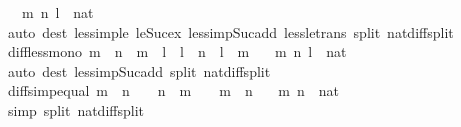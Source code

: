 \begin{isabellebody}
\ \ \ m\ n\ l\ {\isacharcolon}{\kern0pt}{\isacharcolon}{\kern0pt}\ nat\isanewline
%
\isadelimproof
\ \ %
\endisadelimproof
%
\isatagproof
{}\isamarkupfalse%
\ {\isacharparenleft}{\kern0pt}auto\ dest{\isacharcolon}{\kern0pt}\ less{\isacharunderscore}{\kern0pt}imp{\isacharunderscore}{\kern0pt}le\ le{\isacharunderscore}{\kern0pt}Suc{\isacharunderscore}{\kern0pt}ex\ less{\isacharunderscore}{\kern0pt}imp{\isacharunderscore}{\kern0pt}Suc{\isacharunderscore}{\kern0pt}add\ less{\isacharunderscore}{\kern0pt}le{\isacharunderscore}{\kern0pt}trans\ split{\isacharcolon}{\kern0pt}\ nat{\isacharunderscore}{\kern0pt}diff{\isacharunderscore}{\kern0pt}split{\isacharparenright}{\kern0pt}%
\endisatagproof
{\isafoldproof}%
%
\isadelimproof
\isanewline
%
\endisadelimproof
\isanewline
{}\isamarkupfalse%
\ diff{\isacharunderscore}{\kern0pt}less{\isacharunderscore}{\kern0pt}mono{}{\isacharcolon}{\kern0pt}\ {\isachardoublequoteopen}m\ {\isacharless}{\kern0pt}\ n\ {\isasymLongrightarrow}\ m\ {\isacharless}{\kern0pt}\ l\ {\isasymLongrightarrow}\ l\ {\isacharminus}{\kern0pt}\ n\ {\isacharless}{\kern0pt}\ l\ {\isacharminus}{\kern0pt}\ m{\isachardoublequoteclose}\isanewline
\ \ \ m\ n\ l\ {\isacharcolon}{\kern0pt}{\isacharcolon}{\kern0pt}\ nat\isanewline
%
\isadelimproof
\ \ %
\endisadelimproof
%
\isatagproof
{}\isamarkupfalse%
\ {\isacharparenleft}{\kern0pt}auto\ dest{\isacharcolon}{\kern0pt}\ less{\isacharunderscore}{\kern0pt}imp{\isacharunderscore}{\kern0pt}Suc{\isacharunderscore}{\kern0pt}add\ split{\isacharcolon}{\kern0pt}\ nat{\isacharunderscore}{\kern0pt}diff{\isacharunderscore}{\kern0pt}split{\isacharparenright}{\kern0pt}%
\endisatagproof
{\isafoldproof}%
%
\isadelimproof
\isanewline
%
\endisadelimproof
\isanewline
{}\isamarkupfalse%
\ diffs{}{\isacharunderscore}{\kern0pt}imp{\isacharunderscore}{\kern0pt}equal{\isacharcolon}{\kern0pt}\ {\isachardoublequoteopen}m\ {\isacharminus}{\kern0pt}\ n\ {\isacharequal}{\kern0pt}\ {}\ {\isasymLongrightarrow}\ n\ {\isacharminus}{\kern0pt}\ m\ {\isacharequal}{\kern0pt}\ {}\ {\isasymLongrightarrow}\ m\ {\isacharequal}{\kern0pt}\ n{\isachardoublequoteclose}\isanewline
\ \ \ m\ n\ {\isacharcolon}{\kern0pt}{\isacharcolon}{\kern0pt}\ nat\isanewline
%
\isadelimproof
\ \ %
\endisadelimproof
%
\isatagproof
{}\isamarkupfalse%
\ {\isacharparenleft}{\kern0pt}simp\ split{\isacharcolon}{\kern0pt}\ nat{\isacharunderscore}{\kern0pt}diff{\isacharunderscore}{\kern0pt}split{\isacharparenright}{\kern0pt}%

\end{isabellebody}
